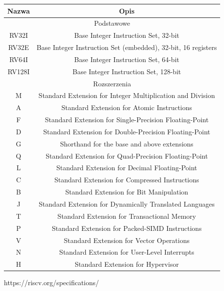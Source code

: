\documentclass[11pt,a4paper]{article}
\begin{document}
		\begin{center}
			\begin{tabular}{|c|c|}
				\hline
				Nazwa  & Opis\\
				\hline
				\multicolumn{2}{|c|}{Podstawowe} \\
				\hline
				RV32I & Base Integer Instruction Set, 32-bit\\
				\hline
				RV32E & Base Integer Instruction Set (embedded), 32-bit, 16 registers\\
				\hline
				RV64I & Base Integer Instruction Set, 64-bit \\
				\hline
				RV128I & Base Integer Instruction Set, 128-bit \\
				\hline
				\multicolumn{2}{|c|}{Rozszerzenia} \\
				\hline
				M & Standard Extension for Integer Multiplication and Division \\
				\hline
				A & Standard Extension for Atomic Instructions \\
				\hline
				F & Standard Extension for Single-Precision Floating-Point \\
				\hline
				D & Standard Extension for Double-Precision Floating-Point \\
				\hline
				G & Shorthand for the base and above extensions \\
				\hline
				Q & Standard Extension for Quad-Precision Floating-Point \\
				\hline
				L & Standard Extension for Decimal Floating-Point \\
				\hline
				C & Standard Extension for Compressed Instructions \\
				\hline
				B & Standard Extension for Bit Manipulation \\
				\hline
				J & Standard Extension for Dynamically Translated Languages \\
				\hline
				T & Standard Extension for Transactional Memory \\
				\hline
				P & Standard Extension for Packed-SIMD Instructions \\
				\hline
				V & Standard Extension for Vector Operations \\
				\hline
				N & Standard Extension for User-Level Interrupts \\
				\hline
				H & Standard Extension for Hypervisor \\
				\hline
				\end{tabular}
		\end{center}https://riscv.org/specifications/
\end{document}
